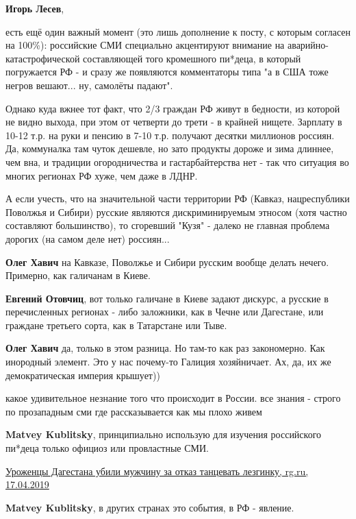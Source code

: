 \begin{itemize}
\textbf{Игорь Лесев}, 

есть ещё один важный момент (это лишь дополнение к посту, с которым согласен на
100\%): российские СМИ специально акцентируют внимание на
аварийно-катастрофической составляющей того кромешного пи*деца, в который
погружается РФ - и сразу же появляются комментаторы типа "а в США тоже негров
вешают... ну, самолёты падают".

Однако куда вжнее тот факт, что 2/3 граждан РФ живут в бедности, из которой не
видно выхода, при этом от четверти до трети - в крайней нищете. Зарплату в
10-12 т.р. на руки и пенсию в 7-10 т.р. получают десятки миллионов россиян. Да,
коммуналка там чуток дешевле, но зато продукты дороже и зима длиннее, чем вна,
и традиции огородничества и гастарбайтерства нет - так что ситуация во многих
регионах РФ хуже, чем даже в ЛДНР.

А если учесть, что на значительной части территории РФ (Кавказ, нацреспублики
Поволжья и Сибири) русские являются дискриминируемым этносом (хотя частно
составляют большинство), то сгоревший "Кузя" - далеко не главная проблема
дорогих (на самом деле нет) россиян...

\begin{itemize} %
\textbf{Олег Хавич} на Кавказе, Поволжье и Сибири русским вообще делать нечего.
Примерно, как галичанам в Киеве.

\textbf{Евгений Отовчиц}, вот только галичане в Киеве задают дискурс, а русские в перечисленных регионах - либо заложники, как в Чечне или Дагестане, или граждане третьего сорта, как в Татарстане или Тыве.

\textbf{Олег Хавич} да, только в этом разница.
Но там-то как раз закономерно. Как инородный элемент. Это у нас почему-то Галиция хозяйничает. Ах, да, их же демократическая империя крышует))

какое удивительное незнание того что происходит в России. все знания - строго по прозападным сми где рассказывается как мы плохо живем

\textbf{Matvey Kublitsky}, принципиально использую для изучения российского пи*деца только официоз или провластные СМИ.

\href{https://rg.ru/2019/04/17/reg-skfo/urozhency-dagestana-ubili-muzhchinu-za-otkaz-tancevat-lezginku.html}{%
Уроженцы Дагестана убили мужчину за отказ танцевать лезгинку, rg.ru, 17.04.2019%
}

\textbf{Matvey Kublitsky}, в других странах это события, в РФ - явление.


\end{itemize}
\end{itemize}

